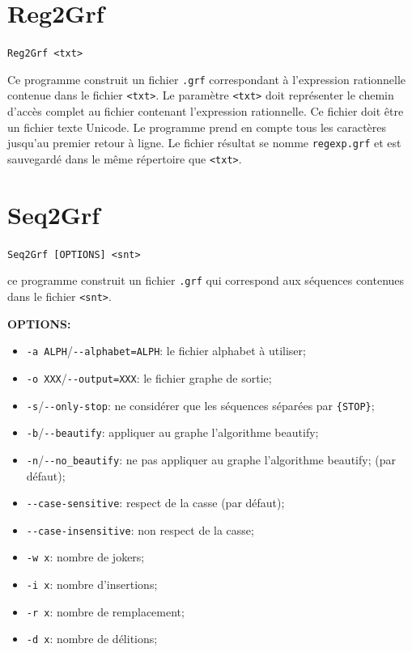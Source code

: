 \section{Reg2Grf}
\verb+Reg2Grf <txt>+

\bigskip
\noindent {} 
Ce programme construit un fichier
\verb+.grf+ correspondant à l’expression rationnelle contenue dans le fichier \verb+<txt>+.
Le paramètre \verb+<txt>+ doit représenter le chemin d’accès complet au fichier contenant
l’expression rationnelle. Ce fichier doit être un fichier texte Unicode. Le programme prend en
compte tous les caractères jusqu’au premier retour à ligne. Le fichier résultat se nomme
\verb+regexp.grf+ et est sauvegardé dans le même répertoire que \verb+<txt>+.





\section{Seq2Grf}
\label{Seq2Grf}
\verb+Seq2Grf [OPTIONS] <snt>+

\bigskip
\noindent ce programme construit un fichier \verb+.grf+ 
qui correspond aux séquences contenues dans le fichier \verb+<snt>+.

\bigskip
\noindent \textbf{OPTIONS:}

\begin{itemize}
  \item \verb+-a ALPH+/\verb+--alphabet=ALPH+: le fichier alphabet à utiliser;
  \item \verb+-o XXX+/\verb+--output=XXX+: le fichier graphe de sortie;
  \item \verb+-s+/\verb+--only-stop+: ne considérer que les séquences séparées par \verb+{STOP}+;
  \item \verb+-b+/\verb+--beautify+: appliquer au graphe l'algorithme beautify;
  \item \verb+-n+/\verb+--no_beautify+: ne pas appliquer au graphe l'algorithme beautify; (par défaut);
  \item \verb+--case-sensitive+: respect de la casse (par défaut);
  \item \verb+--case-insensitive+: non respect de la casse;
  \item \verb+-w x+: nombre de jokers;
  \item \verb+-i x+: nombre d'insertions;
  \item \verb+-r x+: nombre de remplacement;
  \item \verb+-d x+: nombre de délitions;
\end{itemize}

